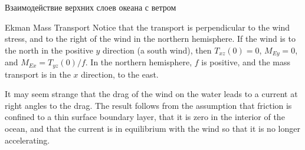 \begin{chapter}{Взаимодействие верхних слоев океана с ветром}
\begin{section}{Ekman Mass Transport}
Notice that the transport is perpendicular to the wind
stress, and to the
right of the wind in the northern hemisphere. If the wind is to the
north in the positive $y$ direction (a south wind), then $T_{xz}(0) =
0$, $M_{Ey} = 0$, and $M_{Ex} = T_{yz}(0)/f$. In the northern
hemisphere, $f$ is positive, and the mass transport is in the $x$
direction, to the east.
%

It may seem strange that the drag of the wind on the water leads to a
current at right angles to the drag. The result follows from the
assumption that friction is confined to a thin surface boundary layer,
that it is zero in the interior of the ocean, and that the current is
in equilibrium with the wind so that it is no longer accelerating.
%


\end{section}
\end{chapter}
